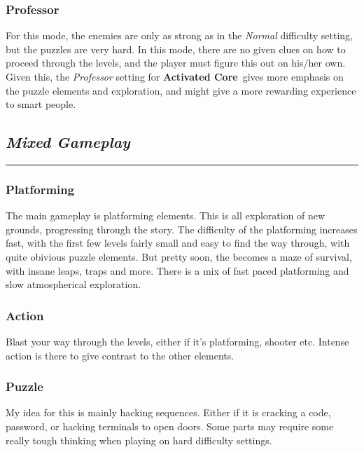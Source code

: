 \documentclass[a5paper, 10pt, titlepage, landscape, twoside, final]{article}
\newcommand{\ac}{\textbf{Activated Core}}
\begin{document}
\subsubsection{Professor}
For this mode, the enemies are only as strong as in the \textit{Normal} difficulty setting, but the puzzles are very hard. In this mode, there are no given clues on how to proceed through the levels, and the player must figure this out on his/her own. Given this, the \textit{Professor} setting for \ac\ gives more emphasis on the puzzle elements and exploration, and might give a more rewarding experience to smart people.




\clearpage
\begin{center}
\subsection{\textit{Mixed Gameplay}}
\end{center}
\hrule\par
%
\subsubsection{Platforming}
The main gameplay is platforming elements. This is all exploration of new grounds, progressing through the story. The difficulty of the platforming increases fast, with the first few levels fairly small and easy to find the way through, with quite obivious puzzle elements. But pretty soon, the becomes a maze of survival, with insane leaps, traps and more. There is a mix of fast paced platforming and slow atmospherical exploration.

\subsubsection{Action}
Blast your way through the levels, either if it's platforming, shooter etc. Intense action is there to give contrast to the other elements.

\subsubsection{Puzzle}
My idea for this is mainly hacking sequences. Either if it is cracking a code, password, or hacking terminals to open doors. Some parts may require some really tough thinking when playing on hard difficulty settings.
\end{document}
